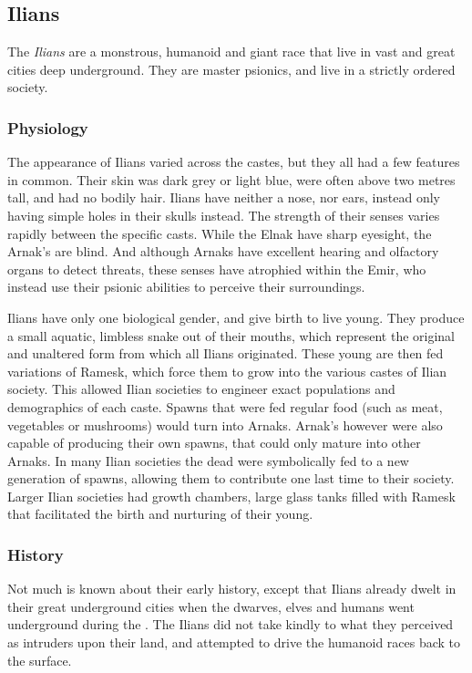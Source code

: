 \subsection{Ilians}
\label{sec:Ilians}

The \emph{Ilians} are a monstrous, humanoid and giant race that live in vast
and great cities deep underground. They are master psionics, and live in a
strictly ordered society.

\subsubsection{Physiology}

The appearance of Ilians varied across the castes, but they all had a few
features in common. Their skin was dark grey or light blue, were often above
two metres tall, and had no bodily hair. Ilians have neither a nose, nor ears,
instead only having simple holes in their skulls instead. The strength of
their senses varies rapidly between the specific casts. While the Elnak have
sharp eyesight, the Arnak's are blind. And although Arnaks have excellent
hearing and olfactory organs to detect threats, these senses have atrophied
within the Emir, who instead use their psionic abilities to perceive their
surroundings.

Ilians have only one biological gender, and give birth to live young. They
produce a small aquatic, limbless snake out of their mouths, which represent
the original and unaltered form from which all Ilians originated. These young
are then fed variations of Ramesk, which force them to grow into the various
castes of Ilian society. This allowed Ilian societies to engineer exact
populations and demographics of each caste. Spawns that were fed regular food
(such as meat, vegetables or mushrooms) would turn into Arnaks. Arnak's
however were also capable of producing their own spawns, that could only
mature into other Arnaks. In many Ilian societies the dead were symbolically
fed to a new generation of spawns, allowing them to contribute one last time
to their society. Larger Ilian societies had growth chambers, large glass
tanks filled with Ramesk that facilitated the birth and nurturing of their
young.

\subsubsection{History}

Not much is known about their early history, except that Ilians already dwelt
in their great underground cities when the dwarves, elves and humans went
underground during the . The Ilians did not take kindly to
what they perceived as intruders upon their land, and attempted to drive the
humanoid races back to the surface.

